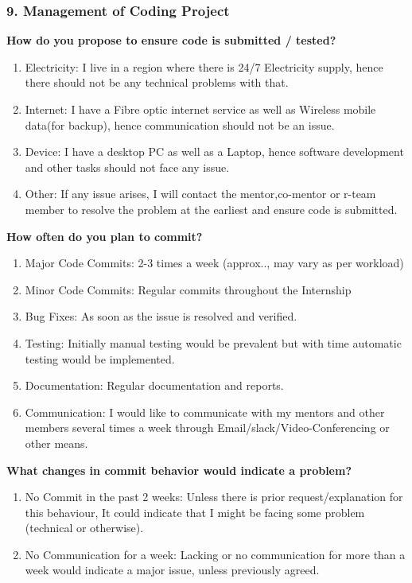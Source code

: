 \documentclass[12pt]{article}
\begin{document}
\subsubsection{9. Management of Coding Project}
{\large\bfseries How do you propose to ensure code is submitted / tested?}
\begin{enumerate}[label = {  \color{MediumBlue} \textbf{\arabic*. }},align=left]
 \item {\color{MediumBlue} Electricity}: I live in a region where there is 24/7 Electricity supply, hence there should not be any technical problems with that. 
 \item {\color{MediumBlue} Internet}: I have a Fibre optic internet service as well as Wireless mobile data(for backup), hence communication should not be an issue.
 \item {\color{MediumBlue} Device}: I have a desktop PC as well as a Laptop, hence software development and other tasks should not face any issue.
 \item {\color{MediumBlue} Other}: If any issue arises, I will contact the mentor,co-mentor or r-team member to resolve the problem at the earliest and ensure code is submitted.
\end{enumerate}
{\large\bfseries How often do you plan to commit?}
\begin{enumerate}[label = {  \color{MediumBlue} \textbf{\arabic*. }},align=left]
 \item {\color{MediumBlue} Major Code Commits}: 2-3 times a week (approx.., may vary as per workload)
 \item {\color{MediumBlue} Minor Code Commits}: Regular commits throughout the Internship
 \item {\color{MediumBlue} Bug Fixes}: As soon as the issue is resolved and verified. 
 \item {\color{MediumBlue} Testing}: Initially manual testing would be prevalent but with time automatic testing would be implemented.
 \item {\color{MediumBlue} Documentation}: Regular documentation and reports.
 \item{\color{MediumBlue} Communication}:  I would like to communicate with my mentors and other members several times a week through Email/slack/Video-Conferencing or other means.
\end{enumerate}
{\large\bfseries What changes in commit behavior would indicate a problem?}\\
\begin{enumerate}[label = {  \color{MediumBlue} \textbf{\arabic*. }},align=left]
 \item {\color{MediumBlue} No Commit in the past 2 weeks}: Unless there is prior request/explanation for this behaviour, It could indicate that I might be facing some problem (technical or otherwise).
 \item {\color{MediumBlue} No Communication for a week}: Lacking or no communication for more than a week would indicate a major issue, unless previously agreed.
\end{enumerate}
\end{document}
